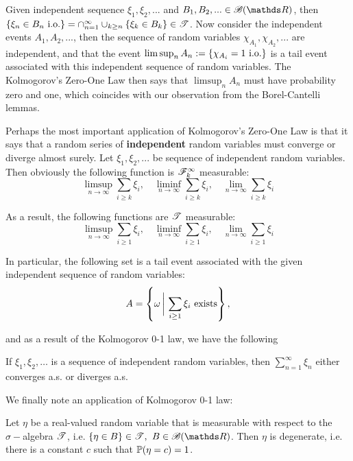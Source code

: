\begin{example}
Given independent sequence $\xi_1, \xi_2, ...$ and $B_1, B_2, ... \in \B(\R)$, then $\left\{ \xi_n \in B_n \text{ i.o.} \right \} = \cap_{n=1}^\infty \cup_{k\geq n} \left\{ \xi_k \in B_k \right \} \in \mathcal{T}$. Now consider the independent events $A_1, A_2, ...$, then the sequence of random variables $\chi_{A_1}, \chi_{A_2}, ...$ are independent, and that the event $\limsup_{n} A_n := \left\{ \chi_{A_i} = 1 \text{ i.o.} \right \}$ is a tail event associated with this independent sequence of random variables. The Kolmogorov's Zero-One Law then says that $\limsup_{n} A_n$ must have probability zero and one, which coincides with our observation from the Borel-Cantelli lemmas.
\end{example}

Perhaps the most important application of Kolmogorov's Zero-One Law is that it says that a random series of \textbf{independent} random variables must converge or diverge almost surely. Let $\xi_1, \xi_2, ...$ be sequence of independent random variables. Then obviously the following function is $\mathcal{F}_k^\infty$ measurable:
\begin{equation*}
    \limsup_{n\to\infty} \sum_{i\geq k} \xi_i, \quad \liminf_{n\to\infty} \sum_{i\geq k} \xi_i, \quad \lim_{n\to\infty} \sum_{i\geq k} \xi_i
\end{equation*}

As a result, the following functions are $\mathcal{T}$ measurable:
\begin{equation*}
    \limsup_{n\to\infty} \sum_{i\geq 1} \xi_i, \quad \liminf_{n\to\infty} \sum_{i\geq 1} \xi_i, \quad \lim_{n\to\infty} \sum_{i\geq 1} \xi_i
\end{equation*}

In particular, the following set is a tail event associated with the given independent sequence of random variables:
\begin{equation*}
A = \left\{ \omega \, \bigg| \, \sum_{i\geq 1} \xi_i \text{ exists} \right \},
\end{equation*}

and as a result of the Kolmogorov 0-1 law, we have the following 
\begin{corollary}
If $\xi_1, \xi_2, \dots$ is a sequence of independent random variables, then $\sum_{n=1}^\infty \xi_n$ either converges a.s. or diverges a.s.
\end{corollary}

We finally note an application of Kolmogorov 0-1 law:
\begin{example}
Let $\eta$ be a real-valued random variable that is measurable with respect to the $\sigma-$algebra $\mathcal{T}$, i.e. $\{ \eta \in B\} \in \mathcal{T},$ $B \in \B(\R)$. Then $\eta$ is degenerate, i.e. there is a constant $c$ such that $\mathbb{P}(\eta = c) = 1$.
\end{example}

